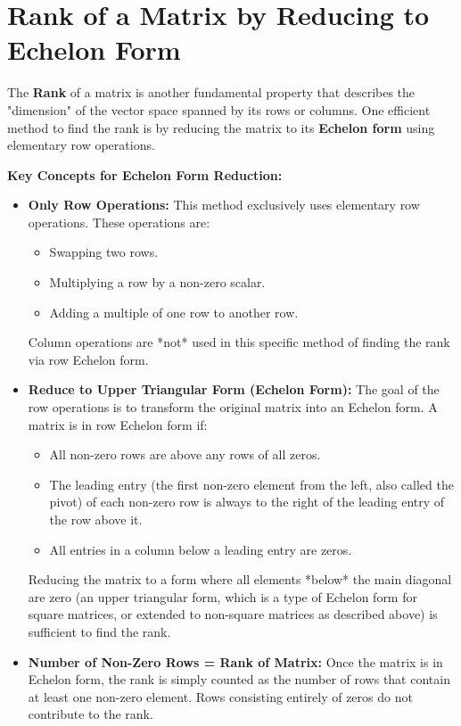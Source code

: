 \documentclass{article}
\begin{document}
\section{Rank of a Matrix by Reducing to Echelon Form}

The \textbf{Rank} of a matrix is another fundamental property that describes the "dimension" of the vector space spanned by its rows or columns. One efficient method to find the rank is by reducing the matrix to its \textbf{Echelon form} using elementary row operations.

\textbf{Key Concepts for Echelon Form Reduction:}
\begin{itemize}
    \item \textbf{Only Row Operations:} This method exclusively uses elementary row operations. These operations are:
    \begin{itemize}
        \item Swapping two rows.
        \item Multiplying a row by a non-zero scalar.
        \item Adding a multiple of one row to another row.
    \end{itemize}
    Column operations are *not* used in this specific method of finding the rank via row Echelon form.
    \item \textbf{Reduce to Upper Triangular Form (Echelon Form):} The goal of the row operations is to transform the original matrix into an Echelon form. A matrix is in row Echelon form if:
    \begin{itemize}
        \item All non-zero rows are above any rows of all zeros.
        \item The leading entry (the first non-zero element from the left, also called the pivot) of each non-zero row is always to the right of the leading entry of the row above it.
        \item All entries in a column below a leading entry are zeros.
    \end{itemize}
    Reducing the matrix to a form where all elements *below* the main diagonal are zero (an upper triangular form, which is a type of Echelon form for square matrices, or extended to non-square matrices as described above) is sufficient to find the rank.
    \item \textbf{Number of Non-Zero Rows = Rank of Matrix:} Once the matrix is in Echelon form, the rank is simply counted as the number of rows that contain at least one non-zero element. Rows consisting entirely of zeros do not contribute to the rank.
\end{itemize}
\end{document}
